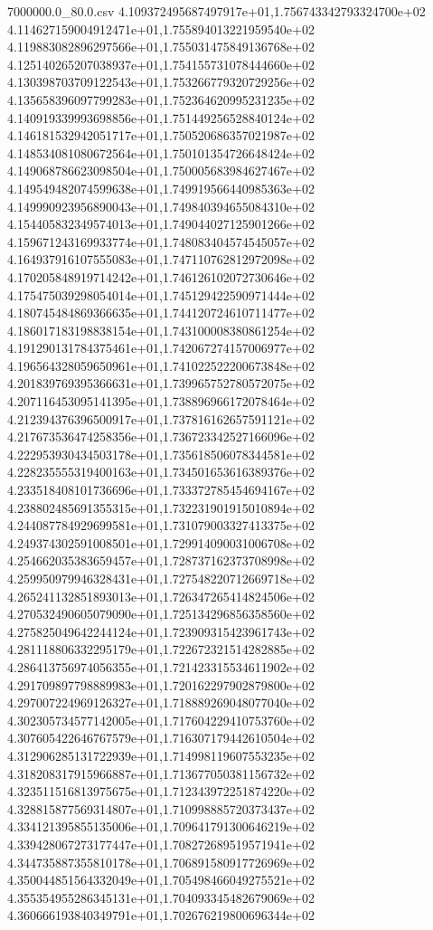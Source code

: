\begin{filecontents*}{7000000.0_80.0.csv}
4.109372495687497917e+01,1.756743342793324700e+02
4.114627159004912471e+01,1.755894013221959540e+02
4.119883082896297566e+01,1.755031475849136768e+02
4.125140265207038937e+01,1.754155731078444660e+02
4.130398703709122543e+01,1.753266779320729256e+02
4.135658396097799283e+01,1.752364620995231235e+02
4.140919339993698856e+01,1.751449256528840124e+02
4.146181532942051717e+01,1.750520686357021987e+02
4.148534081080672564e+01,1.750101354726648424e+02
4.149068786623098504e+01,1.750005683984627467e+02
4.149549482074599638e+01,1.749919566440985363e+02
4.149990923956890043e+01,1.749840394655084310e+02
4.154405832349574013e+01,1.749044027125901266e+02
4.159671243169933774e+01,1.748083404574545057e+02
4.164937916107555083e+01,1.747110762812972098e+02
4.170205848919714242e+01,1.746126102072730646e+02
4.175475039298054014e+01,1.745129422590971444e+02
4.180745484869366635e+01,1.744120724610711477e+02
4.186017183198838154e+01,1.743100008380861254e+02
4.191290131784375461e+01,1.742067274157006977e+02
4.196564328059650961e+01,1.741022522200673848e+02
4.201839769395366631e+01,1.739965752780572075e+02
4.207116453095141395e+01,1.738896966172078464e+02
4.212394376396500917e+01,1.737816162657591121e+02
4.217673536474258356e+01,1.736723342527166096e+02
4.222953930434503178e+01,1.735618506078344581e+02
4.228235555319400163e+01,1.734501653616389376e+02
4.233518408101736696e+01,1.733372785454694167e+02
4.238802485691355315e+01,1.732231901915010894e+02
4.244087784929699581e+01,1.731079003327413375e+02
4.249374302591008501e+01,1.729914090031006708e+02
4.254662035383659457e+01,1.728737162373708998e+02
4.259950979946328431e+01,1.727548220712669718e+02
4.265241132851893013e+01,1.726347265414824506e+02
4.270532490605079090e+01,1.725134296856358560e+02
4.275825049642244124e+01,1.723909315423961743e+02
4.281118806332295179e+01,1.722672321514282885e+02
4.286413756974056355e+01,1.721423315534611902e+02
4.291709897798889983e+01,1.720162297902879800e+02
4.297007224969126327e+01,1.718889269048077040e+02
4.302305734577142005e+01,1.717604229410753760e+02
4.307605422646767579e+01,1.716307179442610504e+02
4.312906285131722939e+01,1.714998119607553235e+02
4.318208317915966887e+01,1.713677050381156732e+02
4.323511516813975675e+01,1.712343972251874220e+02
4.328815877569314807e+01,1.710998885720373437e+02
4.334121395855135006e+01,1.709641791300646219e+02
4.339428067273177447e+01,1.708272689519571941e+02
4.344735887355810178e+01,1.706891580917726969e+02
4.350044851564332049e+01,1.705498466049275521e+02
4.355354955286345131e+01,1.704093345482679069e+02
4.360666193840349791e+01,1.702676219800696344e+02

\end{filecontents*}
